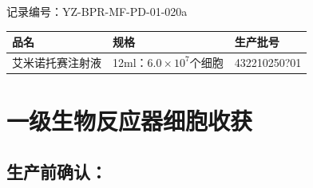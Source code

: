 \documentclass[UTF8,10pt,a4paper,fontset=fandol]{ctexart}
\newcommand{\fieldvalue}[1]{#1}
\newcommand{\handwritten}[1]{#1}
\begin{document}
记录编号：YZ-BPR-MF-PD-01-020a

\begin{tabularx}{\textwidth}{|X|X|X|}
\hline
品名 & 规格 & 生产批号 \\
\hline
艾米诺托赛注射液 & 12ml：$6.0\times 10^{7}$个细胞 &
\fieldvalue{\handwritten{432210250?01}} \\
\hline
\end{tabularx}

\section{一级生物反应器细胞收获}

\subsection{生产前确认：}
\end{document}

